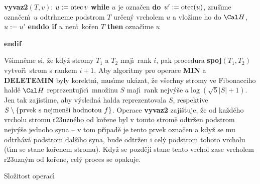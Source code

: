 {\bf vyvaz2$(T,v)$}:\newline 
$u:=\operatorname{otec} v$\newline 
{\bf while} $u$ je ozna\v cen {\bf do\newline 
\phantom{---}$u':=\operatorname{otec}(u)$}, zru\v s\'\i me ozna\v cen\'\i\ $u$\newline 
\phantom{---}odtrhneme podstrom $T$ ur\v cen\'y vrcholem $u$ a vlo\v z\'\i me ho 
do $\Cal H$, $u:=u'$\newline 
{\bf enddo\newline 
if} $u$ nen\'\i\ ko\v ren $T$ {\bf then} ozna\v c\'\i me $u$ {\bf endif
\medskip

}\flushpar V\v simn\v eme si, \v ze kdy\v z stromy $T_1$ a $T_2$ maj\'\i\ rank 
$i$, pak procedura {\bf spoj$(T_1,T_2)$} vytvo\v r\'\i\ strom s rankem 
$i+1$.  Aby algoritmy pro operace {\bf MIN} a {\bf DELETEMIN} byly 
korektn\'\i , mus\'\i me uk\'azat, \v ze v\v sechny stromy ve 
Fibonacciho hald\v e $\Cal H$ reprezentuj\'\i c\'\i\ mno\v zinu $
S$ maj\'\i\ rank 
nejv\'y\v se $a\log(\sqrt 5|S|+1)$. Jen tak zajist\'\i me, aby v\'ysledn\'a 
halda reprezentovala $S$, res\-pektive 
$S\setminus \{\text{\rm prvek s nejmen\v s\'\i\ hodnotou }f\}$.  Operace {\bf vyvaz2 }
zaji\v s\v tuje, \v ze od ka\v zd\'eho vrcholu stromu r\accent23uzn\'eho 
od ko\v rene byl v tomto strom\v e odtr\v zen podstrom nejv\'y\v se 
jednoho syna -- v tom p\v r\'\i pad\v e je tento prvek ozna\v cen a 
kdy\v z se mu odtrh\'av\'a podstrom dal\v s\'\i ho syna, bude odtr\v zen 
i cel\'y podstrom tohoto vrcholu (t\'\i m se stane ko\v renem 
stromu).  Kdy\v z se pozd\v eji stane tento vrchol zase 
vrcholem r\accent23uzn\'ym od ko\v rene, cel\'y proces se 
opakuje. 
\medskip

\subhead
Slo\v zitost operac\'\i
\endsubhead
\smallskip

